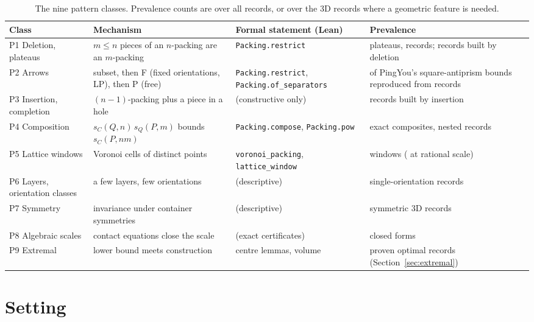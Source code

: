 \documentclass[11pt,a4paper]{article}
\newcommand{\lean}[1]{\texttt{#1}}
\theoremstyle{definition}
\theoremstyle{remark}
\begin{document}
\begin{table}[t]
\centering\small
\begin{tabularx}{\textwidth}{>{\raggedright}p{2.6cm} >{\raggedright}X >{\raggedright}p{3.6cm} >{\raggedright\arraybackslash}p{3.4cm}}
\toprule
Class & Mechanism & Formal statement (Lean) & Prevalence \\
\midrule
P1 Deletion, plateaus & $m\le n$ pieces of an $n$-packing are an $m$-packing & \lean{Packing.restrict} & \nPlateaus{} plateaus, \nPlateauRecords{} records; \nMonotone{} records built by deletion \\
P2 Arrows & subset, then F (fixed orientations, LP), then P (free) & \lean{Packing.restrict}, \lean{Packing.of\_separators} & 3 of PingYou's square-antiprism bounds reproduced from records \\
P3 Insertion, completion & $(n-1)$-packing plus a piece in a hole & (constructive only) & \nAscend{} records built by insertion \\
P4 Composition & $s_{C}(Q,n)\,s_{Q}(P,m)$ bounds $s_C(P,nm)$ & \lean{Packing.compose}, \lean{Packing.pow} & \nComposites{} exact composites, \nNested{} nested records \\
P5 Lattice windows & Voronoi cells of distinct points & \lean{voronoi\_packing}, \lean{lattice\_window} & \nLattice{} windows (\nLatticeRational{} at rational scale) \\
P6 Layers, orientation classes & a few layers, few orientations & (descriptive) & \nOneOrient{} single-orientation records \\
P7 Symmetry & invariance under container symmetries & (descriptive) & \nSymNontrivial{} symmetric 3D records \\
P8 Algebraic scales & contact equations close the scale & (exact certificates) & \nClosedForms{} closed forms \\
P9 Extremal & lower bound meets construction & centre lemmas, volume & proven optimal records (Section~\ref{sec:extremal}) \\
\bottomrule
\end{tabularx}
\caption{The nine pattern classes. Prevalence counts are over all \nRecords{} records, or over the \nFeat{} 3D records where a geometric feature is needed.}
\label{tab:taxonomy}
\end{table}

\section{Setting}
\end{document}
